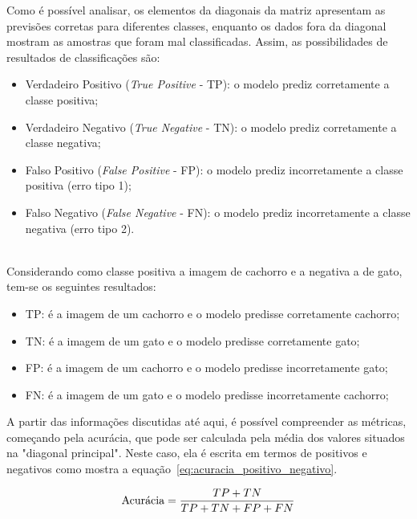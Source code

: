             Como é possível analisar, os elementos da diagonais da matriz apresentam as previsões corretas para diferentes classes, enquanto os dados fora da diagonal mostram as amostras que foram mal classificadas. Assim, as possibilidades de resultados de classificações são:
            \begin{itemize}
                \item Verdadeiro Positivo (\textit{True Positive} - TP): o modelo prediz corretamente a classe positiva;
                \item Verdadeiro Negativo (\textit{True Negative} - TN): o modelo prediz corretamente a classe negativa;
                \item Falso Positivo (\textit{False Positive} - FP): o modelo prediz incorretamente a classe positiva (erro tipo 1);
                \item Falso Negativo (\textit{False Negative} - FN): o modelo prediz incorretamente a classe negativa (erro tipo 2).
            \end{itemize}\\
            
            Considerando como classe positiva a imagem de cachorro e a negativa a de gato, tem-se os seguintes resultados:
            \begin{itemize}
                \item TP: é a imagem de um cachorro e o modelo predisse corretamente cachorro;
                \item TN: é a imagem de um gato e o modelo predisse corretamente gato;
                \item FP: é a imagem de um cachorro e o modelo predisse incorretamente gato;
                \item FN: é a imagem de um gato e o modelo predisse incorretamente cachorro;
            \end{itemize}
            
            A partir das informações discutidas até aqui, é possível compreender as métricas, começando pela acurácia, que pode ser calculada pela média dos valores situados na "diagonal principal". Neste caso, ela é escrita em termos de positivos e negativos como mostra a equação~\ref{eq:acuracia_positivo_negativo}.
            
            \begin{equation}
                \centering
                \text{Acurácia} = \frac{TP + TN}{TP + TN + FP + FN}
                \label{eq:acuracia_positivo_negativo}
            \end{equation}
            
